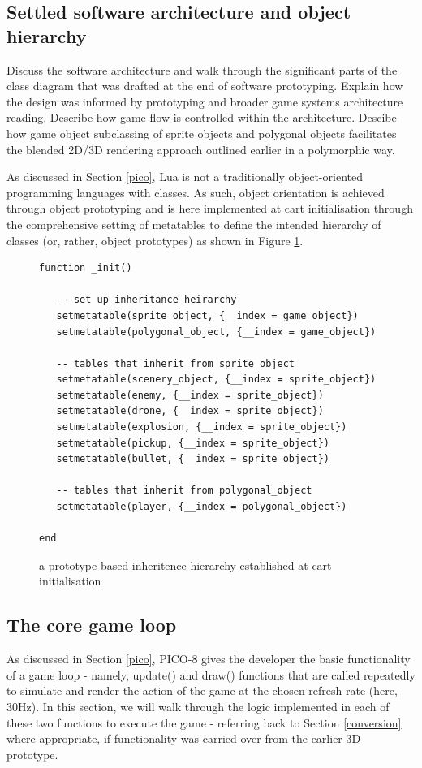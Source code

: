 \documentclass[11pt]{article}
\begin{document}
\subsection{Settled software architecture and object hierarchy}
Discuss the software architecture and walk through the significant parts of the
class diagram that was drafted at the end of software prototyping. Explain how the
design was informed by prototyping and broader game systems architecture reading.
Describe how game flow is controlled within the architecture. Descibe how game object
subclassing of sprite objects and polygonal objects facilitates the blended
2D/3D rendering approach outlined earlier in a polymorphic way. 

As discussed in Section \ref{pico}, Lua is not a traditionally object-oriented programming
languages with classes. As such, object orientation is achieved through object prototyping and
is here implemented at cart initialisation through the comprehensive setting of metatables
to define the intended hierarchy of classes (or, rather, object prototypes) as shown in Figure
\ref{fig:codeinheritance}.

\begin{figure}[h]
   \begin{lstlisting}
function _init()

   -- set up inheritance heirarchy
   setmetatable(sprite_object, {__index = game_object})
   setmetatable(polygonal_object, {__index = game_object})

   -- tables that inherit from sprite_object
   setmetatable(scenery_object, {__index = sprite_object})
   setmetatable(enemy, {__index = sprite_object})
   setmetatable(drone, {__index = sprite_object})
   setmetatable(explosion, {__index = sprite_object})
   setmetatable(pickup, {__index = sprite_object})
   setmetatable(bullet, {__index = sprite_object})

   -- tables that inherit from polygonal_object
   setmetatable(player, {__index = polygonal_object})

end
   \end{lstlisting}
   \caption{a prototype-based inheritence hierarchy established at cart initialisation}
   \label{fig:codeinheritance}
\end{figure}

\subsection{The core game loop}
As discussed in Section \ref{pico}, PICO-8 gives the developer the basic functionality
of a game loop - namely, \textunderscore update() and \textunderscore draw() functions that
are called repeatedly to
simulate and render the action of the game at the chosen refresh rate (here, 30Hz).
In this section, we will walk through the logic implemented in each of these two functions
to execute the game - referring back to Section \ref{conversion} where appropriate, if
functionality was carried over from the earlier 3D prototype.
\end{document}
